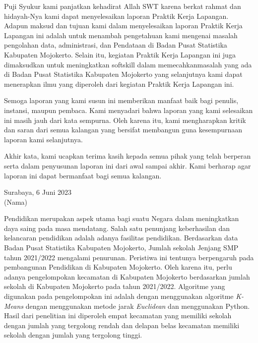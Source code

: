 \documentclass{LaporanPKL}
\begin{document}



\Awal
\HalamanJudul
\HalamanPengesahan
\Keaslian
\newpage
\KataPengantar

Puji  Syukur  kami  panjatkan  kehadirat  Allah  SWT  karena  berkat  rahmat  dan hidayah-Nya kami dapat menyelesaikan laporan Praktik Kerja Lapangan. Adapun maksud dan tujuan kami dalam menyelesaikan laporan Praktik Kerja Lapangan ini adalah  untuk  menambah  pengetahuan  kami  mengenai  masalah  pengolahan  data, administrasi, dan Pendataan di Badan Pusat Statistika Kabupaten Mojokerto. Selain itu,  kegiatan Praktik  Kerja  Lapangan ini  juga  dimaksudkan  untuk  meningkatkan softskill dalam memecahkanmasalah yang ada di Badan Pusat Statistika Kabupaten Mojokerto  yang  selanjutnya kami dapat  menerapkan  ilmu  yang diperoleh  dari kegiatan Praktik Kerja Lapangan ini.

Semoga  laporan  yang  kami  susun  ini  memberikan  manfaat  baik  bagi  penulis, instansi, maupun pembaca. Kami menyadari bahwa laporan yang kami selesaikan ini masih jauh dari kata sempurna. Oleh karena itu, kami mengharapkan kritik dan saran dari semua kalangan yang bersifat membangun guna kesempurnaan laporan kami selanjutnya.

Akhir kata, kami ucapkan terima kasih kepada semua pihak yang telah berperan serta  dalam  penyusunan  laporan  ini  dari  awal  sampai  akhir.  Kami  berharap  agar laporan ini dapat bermanfaat bagi semua kalangan.

\vspace*{5cm}
\begin{flushright}
	Surabaya, 6 Juni 2023\\[5ex]
	(Nama)
\end{flushright}

\begin{Abstrak}
	Pendidikan  merupakan  aspek  utama  bagi  suatu  Negara  dalam  meningkatkan daya   saing pada masa   mendatang.   Salah   satu   penunjang   keberhasilan   dan kelancaran pendidikan adalah adanya fasilitas pendidikan. Berdasarkan data Badan Pusat   Statistika   Kabupaten   Mojokerto,   Jumlah   sekolah   Jenjang   SMP   tahun 2021/2022   mengalami   penurunan.   Peristiwa   ini   tentunya   berpengaruh   pada pembangunan Pendidikan di Kabupaten Mojokerto. Oleh karena itu, perlu adanya pengelompokan kecamatan di Kabupaten Mojokerto berdasarkan jumlah sekolah di Kabupaten  Mojokerto  pada  tahun  2021/2022. Algoritme  yang  digunakan  pada pengelompokan  ini  adalah  dengan  menggunakan  algoritme  \textit{K-Means}  dengan menggunakan  metode jarak \textit{Euclidean} dan  menggunakan   Python. Hasil dari  penelitian  ini  diperoleh empat kecamatan  yang  memiliki sekolah dengan  jumlah yang tergolong  rendah dan delapan belas kecamatan  memiliki sekolah dengan jumlah yang tergolong tinggi.
\end{Abstrak}
\end{document}

